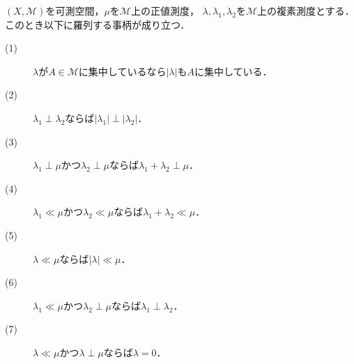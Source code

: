 	\begin{itembox}[l]{}
		\begin{prp}[絶対連続性と特異性に関する性質]
			$(X,\mathcal{M})$を可測空間，$\mu$を$\mathcal{M}$上の正値測度，
			$\lambda,\lambda_1,\lambda_2$を$\mathcal{M}$上の複素測度とする．このとき以下に羅列する事柄が成り立つ．
			\begin{description}
				\item[(1)] $\lambda$が$A \in \mathcal{M}$に集中しているなら$|\lambda|$も$A$に集中している．
				\item[(2)] $\lambda_1 \perp \lambda_2$ならば$|\lambda_1| \perp |\lambda_2|$．
				\item[(3)] $\lambda_1 \perp \mu$かつ$\lambda_2 \perp \mu$ならば$\lambda_1 + \lambda_2 \perp \mu$．
				\item[(4)] $\lambda_1 \ll \mu$かつ$\lambda_2 \ll \mu$ならば$\lambda_1 + \lambda_2 \ll \mu$．
				\item[(5)] $\lambda \ll \mu$ならば$|\lambda| \ll \mu$．
				\item[(6)] $\lambda_1 \ll \mu$かつ$\lambda_2 \perp \mu$ならば$\lambda_1 \perp \lambda_2$．
				\item[(7)] $\lambda \ll \mu$かつ$\lambda \perp \mu$ならば$\lambda = 0$．
			\end{description}
			\label{prp:absolute_continuous_singular}
		\end{prp}
	\end{itembox}